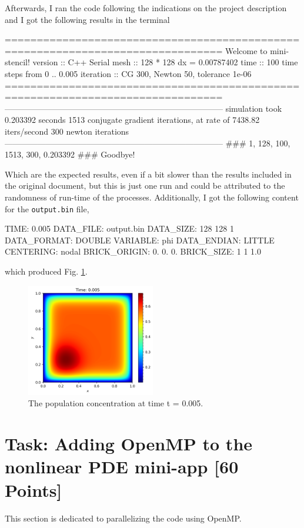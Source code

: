\documentclass[unicode,11pt,a4paper,oneside,numbers=endperiod,openany]{scrartcl}
\begin{document}
Afterwards, I ran the code following the indications on the project description
and I got the following results in the terminal
\begin{grayverbatim}
================================================================================
                      Welcome to mini-stencil!
version   :: C++ Serial
mesh      :: 128 * 128 dx = 0.00787402
time      :: 100 time steps from 0 .. 0.005
iteration :: CG 300, Newton 50, tolerance 1e-06
================================================================================
--------------------------------------------------------------------------------
simulation took 0.203392 seconds
1513 conjugate gradient iterations, at rate of 7438.82 iters/second
300 newton iterations
--------------------------------------------------------------------------------
### 1, 128, 100, 1513, 300, 0.203392 ###
Goodbye!
\end{grayverbatim}
Which are the expected results, even if a bit slower than the results included
in the original document, but this is just one run and could be attributed to
the randomness of run-time of the processes. Additionally, I got the following content for
the \texttt{output.bin} file,
\begin{grayverbatim}
TIME: 0.005
DATA_FILE: output.bin
DATA_SIZE: 128 128 1
DATA_FORMAT: DOUBLE
VARIABLE: phi
DATA_ENDIAN: LITTLE
CENTERING: nodal
BRICK_ORIGIN: 0. 0. 0.
BRICK_SIZE: 1 1  1.0
\end{grayverbatim}
which produced Fig. \ref{im:final_time}.
\begin{figure}[h]
    \centering
    \includegraphics[width=0.5\textwidth]{../mini_app/output.png}
    \caption{The population concentration at time t = 0.005.}
    \label{im:final_time}
\end{figure}

\section{Task:  Adding OpenMP to the nonlinear PDE mini-app [60 Points]}
This section is dedicated to parallelizing the code using OpenMP. 
\end{document}

